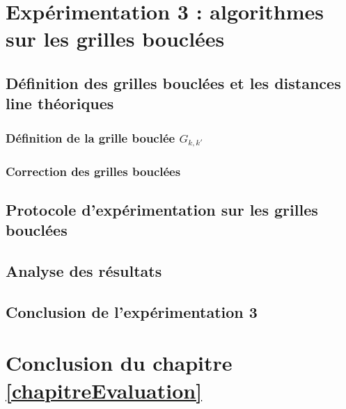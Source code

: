 \section{Exp\'erimentation 3 : algorithmes sur les grilles boucl\'ees}
	
	\subsection{D\'efinition des grilles boucl\'ees et les distances line th\'eoriques}
%		
		\subsubsection{D\'efinition de la grille boucl\'ee $G_{k,k'}$ }
			
		\subsubsection{Correction des grilles boucl\'ees}
			
	\subsection{Protocole d'exp\'erimentation sur les grilles boucl\'ees}
		
	\subsection{Analyse des r\'esultats}
		
	\subsection{Conclusion de l'exp\'erimentation 3}
		

	\section{Conclusion du chapitre \ref{chapitreEvaluation}}
		

%	

